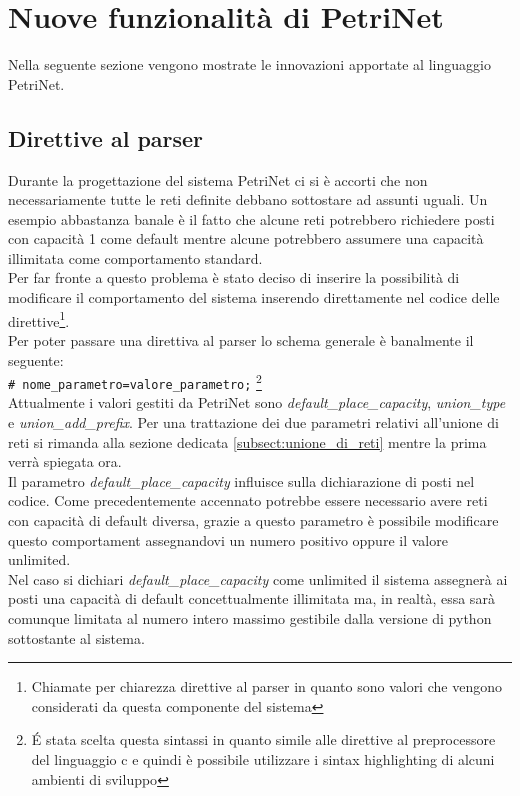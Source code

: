 \documentclass[italian,12pt]{book}
\begin{document}
\section{Nuove funzionalità di PetriNet}
Nella seguente sezione vengono mostrate le innovazioni apportate al linguaggio PetriNet.

\subsection{Direttive al parser}\label{subsec:direttive_al_parser}
Durante la progettazione del sistema PetriNet ci si è accorti che non
necessariamente tutte le reti definite debbano sottostare ad assunti
uguali. Un esempio abbastanza banale è il fatto che alcune reti
potrebbero richiedere posti con capacità 1 come default mentre alcune
potrebbero assumere una capacità illimitata come comportamento
standard. \\
Per far fronte a questo problema è stato deciso di inserire la
possibilità di modificare il comportamento del sistema inserendo
direttamente nel codice delle direttive\footnote{Chiamate per
  chiarezza direttive al parser in quanto sono valori che vengono
  considerati da questa componente del sistema}.\\
Per poter passare una direttiva al parser lo schema generale è
banalmente il
seguente: \\
{\tt \# nome\_parametro=valore\_parametro;} \footnote{\'E stata
  scelta questa sintassi in quanto simile alle direttive al
  preprocessore del linguaggio c e quindi è possibile utilizzare i
  sintax highlighting di alcuni ambienti di sviluppo} \\
Attualmente i valori gestiti da PetriNet sono
\emph{default\_place\_capacity}, \emph{union\_type} e
\emph{union\_add\_prefix}. Per una trattazione dei due parametri
relativi all'unione di reti si rimanda alla sezione dedicata
\ref{subsect:unione_di_reti} mentre la prima verrà spiegata ora. \\
Il parametro \emph{default\_place\_capacity} influisce sulla
dichiarazione di posti nel codice. Come precedentemente accennato
potrebbe essere necessario avere reti con capacità di default diversa,
grazie a questo parametro è possibile modificare questo comportament
assegnandovi un numero positivo oppure il valore unlimited. \\
Nel caso si dichiari \emph{default\_place\_capacity} come unlimited il
sistema assegnerà ai posti una capacità di default concettualmente
illimitata ma, in realtà, essa sarà comunque limitata al numero intero
massimo gestibile dalla versione di python sottostante al sistema.
\end{document}
